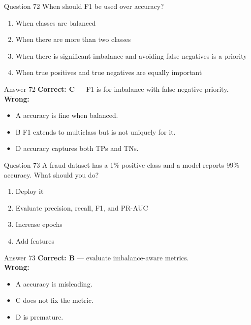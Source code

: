 \documentclass[aspectratio=169,11pt]{beamer}
\begin{document}
	\begin{frame}{Question 72}
		When should F1 be used over accuracy?
		\begin{enumerate}[label=\Alph*.]
			\item When classes are balanced
			\item When there are more than two classes
			\item When there is significant imbalance and avoiding false negatives is a priority
			\item When true positives and true negatives are equally important
		\end{enumerate}
	\end{frame}
	\begin{frame}{Answer 72}
		\textbf{Correct: C} --- F1 is for imbalance with false-negative priority.\\
		\vspace{0.5em}
		\textbf{Wrong:}
		\begin{itemize}
			\item A accuracy is fine when balanced.
			\item B F1 extends to multiclass but is not uniquely for it.
			\item D accuracy captures both TPs and TNs.
		\end{itemize}
	\end{frame}
	
	\begin{frame}{Question 73}
		A fraud dataset has a 1\% positive class and a model reports 99\% accuracy. What should you do?
		\begin{enumerate}[label=\Alph*.]
			\item Deploy it
			\item Evaluate precision, recall, F1, and PR-AUC
			\item Increase epochs
			\item Add features
		\end{enumerate}
	\end{frame}
	\begin{frame}{Answer 73}
		\textbf{Correct: B} --- evaluate imbalance-aware metrics.\\
		\vspace{0.5em}
		\textbf{Wrong:}
		\begin{itemize}
			\item A accuracy is misleading.
			\item C does not fix the metric.
			\item D is premature.
		\end{itemize}
	\end{frame}
	
\end{document}
